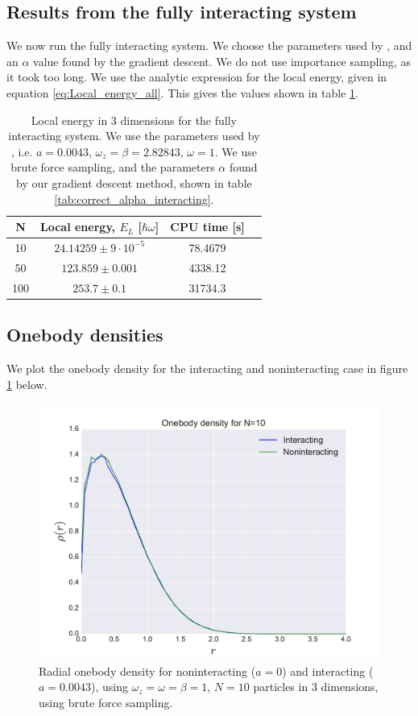 \documentclass[a4paper, 10pt]{article}
\begin{document}
	\subsection{Results from the fully interacting system}
	We now run the fully interacting system. We choose the parameters used by \cite{Nilsen2005}, and an $\alpha$ value found by the gradient descent. We do not use importance sampling, as it took too long. We use the analytic expression for the local energy, given in equation \ref{eq:Local_energy_all}. This gives the values shown in table \ref{tab:fully_interacting_system}.
	\begin{table}[ht!]
		\centering
		\begin{tabular}{cccc}
			N & Local energy, $E_L$ [$\hbar \omega$] & CPU time [s]\\
			\hline
			10 & $24.14259\pm 9\cdot 10^{-5}$ & 78.4679\\
			50 & $123.859\pm 0.001$ & 4338.12\\
			100 & $253.7\pm 0.1$ &31734.3\\
		\end{tabular}
		\caption{Local energy in 3 dimensions for the fully interacting system. We use the parameters used by \cite{Nilsen2005}, i.e. $a=0.0043$, $\omega_z=\beta=2.82843$, $\omega=1$. We use brute force sampling, and the parameters $\alpha$ found by our gradient descent method, shown in table \ref{tab:correct_alpha_interacting}.}\label{tab:fully_interacting_system}
	\end{table}
	\subsection{Onebody densities}
	We plot the onebody density for the interacting and noninteracting case in figure \ref{fig:results_onebody} below.
		\begin{figure}[ht!]
			\centering
			\includegraphics[scale=0.8]{../Results/onbody.pdf}
			\caption{Radial onebody density for noninteracting ($a=0$) and interacting ($a=0.0043$), using $\omega_z=\omega=\beta=1$, $N=10$ particles in $3$ dimensions, using brute force sampling.}\label{fig:results_onebody}
		\end{figure}
\end{document}
